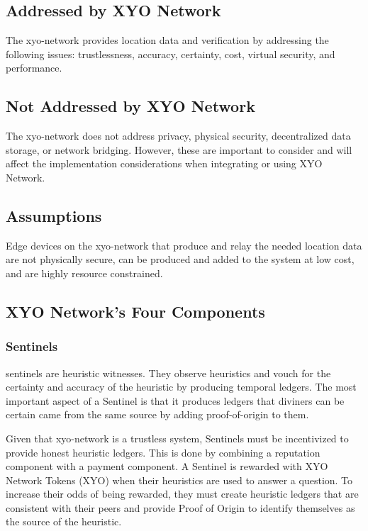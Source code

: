 \documentclass{article}
\begin{document}
\subsection {Addressed by XYO Network}
The \Gls{xyo-network} provides location data and verification by addressing the following issues: trustlessness, accuracy, \gls{certainty}, cost, virtual security, and performance.

\subsection {Not Addressed by XYO Network}
The \Gls{xyo-network} does not address privacy, physical security, decentralized data storage, or network bridging. However, these are important to consider and will affect the implementation considerations when integrating or using XYO Network.

\subsection {Assumptions}
Edge devices on the \Gls{xyo-network} that produce and relay the needed location data are not physically secure, can be produced and added to the system at low cost, and are highly resource constrained.

\subsection {XYO Network's Four Components}

\subsubsection {Sentinels}
\Glspl{sentinel} are \gls{heuristic} witnesses. They observe heuristics and vouch for the \gls{certainty} and \gls{accuracy} of the heuristic by producing temporal ledgers. The most important aspect of a Sentinel is that it produces ledgers that \Glspl{diviner} can be certain came from the same source by adding \Gls{proof-of-origin} to them.

Given that \Gls{xyo-network} is a trustless system, Sentinels must be incentivized to provide honest heuristic ledgers. This is done by combining a reputation component with a payment component. A Sentinel is rewarded with XYO Network Tokens (XYO) when their heuristics are used to answer a question. To increase their odds of being rewarded, they must create heuristic ledgers that are consistent with their peers and provide Proof of Origin to identify themselves as the source of the heuristic.
\end{document}
